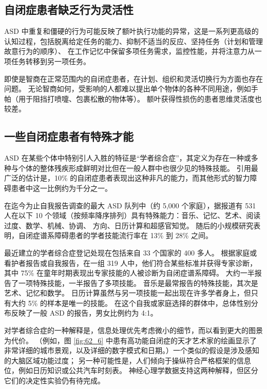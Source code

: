 \subsection{自闭症患者缺乏行为灵活性}

ASD 中重复和僵硬的行为可能反映了额叶执行功能的异常，这是一系列更高级的认知过程，包括脱离给定任务的能力、抑制不适当的反应、坚持任务（计划和管理故意行为的顺序）、 在工作记忆中保留多项任务需求，监控性能，并将注意力从一项任务转移到另一项任务。


即使是智商在正常范围内的自闭症患者，在计划、组织和灵活切换行为方面也存在问题。
无论智商如何，受影响的人都难以提出单个物体的各种不同用途，例如手帕（用于阻挡打喷嚏、包裹松散的物体等）。
额叶获得性损伤的患者思维灵活度也较差。



\subsection{一些自闭症患者有特殊才能}

ASD 在某些个体中特别引人入胜的特征是“学者综合症”，其定义为存在一种或多种与个体的整体残疾形成鲜明对比但在一般人群中也很少见的特殊技能。
引用最广泛的估计是，10\% 的自闭症患者表现出这种非凡的能力，而其他形式的智力障碍患者中这一比例约为千分之一。


在迄今为止自我报告调查的最大 ASD 队列中（约 5,000 个家庭），据报道有 531 人在以下 10 个领域（按频率降序排列）具有特殊能力：音乐、记忆、艺术、阅读过度、数学、机械、协调、 方向、日历计算和超感官知觉。
随后的小规模研究表明，自闭症谱系障碍患者的学者技能流行率在 13\% 到 28\% 之间。


最近建立的学者综合症登记处现在包括来自 33 个国家的 400 多人。
根据家庭或看护者报告或自我报告，在一组 319 人中，他们符合某些标准并获得专家诊断，其中 75\% 在童年时期表现出专家技能的人被诊断为自闭症谱系障碍。
大约一半报告了一项特殊技能，一半报告了多项技能。
音乐是最常报告的特殊技能，其次是艺术、记忆和数学。
日历计算虽然与另一项技能一起出现在许多学者身上，但只有大约 5\% 的样本是唯一的技能。
在这个自我或家庭选择的群体中，总体性别分布反映了一般 ASD 的报告，男女比例约为 4:1。


对学者综合症的一种解释是，信息处理优先考虑微小的细节，而以看到更大的图景为代价。
（例如，图 \ref{fig:62_6} 中患有高功能自闭症的天才艺术家的绘画显示了非常详细的城市景观，以及详细的数字模式和日期。）一个类似的假设是涉及感知的大脑区域功能过度；
另一种可能性是，人们倾向于操纵符合严格框架的信息位，例如日历知识或公共汽车时刻表。
神经心理学数据支持这两种解释，但区分它们的决定性实验仍有待完成。


